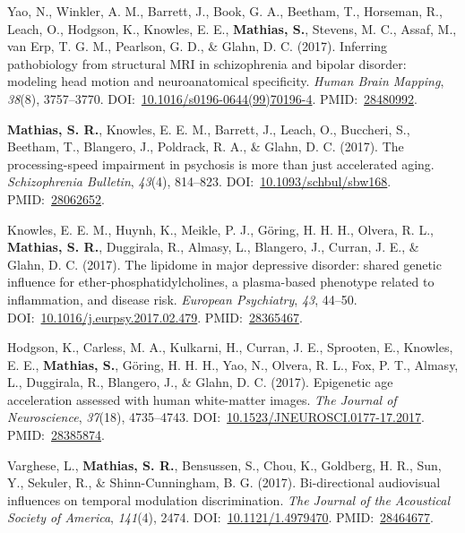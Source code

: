 \documentclass[10pt]{article}
\makeatletter
\newlength{\bibhang}
\newlength{\bibsep}
 {\@listi \global\bibsep\itemsep \global\advance\bibsep by\parsep}
\newenvironment{bibsection}%
        {\vspace{-\baselineskip}\begin{list}{}{%
       \setlength{\leftmargin}{\bibhang}%
       \setlength{\itemindent}{-\leftmargin}%
       \setlength{\itemsep}{\bibsep}%
       \setlength{\parsep}{\z@}%
        \setlength{\partopsep}{0pt}%
        \setlength{\topsep}{0pt}}}
        {\end{list}\vspace{-.6\baselineskip}}
\makeatother
\begin{document}
\begin{bibsection}
\item Yao, N., Winkler, A. M., Barrett, J., Book, G. A., Beetham, T., Horseman, R., Leach, O., Hodgson, K., Knowles, E. E., \textbf{Mathias, S.}, Stevens, M. C., Assaf, M., van Erp, T. G. M., Pearlson, G. D., \& Glahn, D. C. (2017). Inferring pathobiology from structural MRI in schizophrenia and bipolar disorder: modeling head motion and neuroanatomical specificity. \emph{Human Brain Mapping}, \emph{38}(8), 3757--3770. DOI:~\href{https://doi.org/10.1016/s0196-0644(99)70196-4}{10.1016/s0196-0644(99)70196-4}. PMID:~\href{https://www.ncbi.nlm.nih.gov/pubmed/?term=28480992}{28480992}.
\item \textbf{Mathias, S. R.}, Knowles, E. E. M., Barrett, J., Leach, O., Buccheri, S., Beetham, T., Blangero, J., Poldrack, R. A., \& Glahn, D. C. (2017). The processing-speed impairment in psychosis is more than just accelerated aging. \emph{Schizophrenia Bulletin}, \emph{43}(4), 814--823. DOI:~\href{https://doi.org/10.1093/schbul/sbw168}{10.1093/schbul/sbw168}. PMID:~\href{https://www.ncbi.nlm.nih.gov/pubmed/?term=28062652}{28062652}.
\item Knowles, E. E. M., Huynh, K., Meikle, P. J., Göring, H. H. H., Olvera, R. L., \textbf{Mathias, S. R.}, Duggirala, R., Almasy, L., Blangero, J., Curran, J. E., \& Glahn, D. C. (2017). The lipidome in major depressive disorder: shared genetic influence for ether-phosphatidylcholines, a plasma-based phenotype related to inflammation, and disease risk. \emph{European Psychiatry}, \emph{43}, 44--50. DOI:~\href{https://doi.org/10.1016/j.eurpsy.2017.02.479}{10.1016/j.eurpsy.2017.02.479}. PMID:~\href{https://www.ncbi.nlm.nih.gov/pubmed/?term=28365467}{28365467}.
\item Hodgson, K., Carless, M. A., Kulkarni, H., Curran, J. E., Sprooten, E., Knowles, E. E., \textbf{Mathias, S.}, Göring, H. H. H., Yao, N., Olvera, R. L., Fox, P. T., Almasy, L., Duggirala, R., Blangero, J., \& Glahn, D. C. (2017). Epigenetic age acceleration assessed with human white-matter images. \emph{The Journal of Neuroscience}, \emph{37}(18), 4735--4743. DOI:~\href{https://doi.org/10.1523/JNEUROSCI.0177-17.2017}{10.1523/JNEUROSCI.0177-17.2017}. PMID:~\href{https://www.ncbi.nlm.nih.gov/pubmed/?term=28385874}{28385874}.
\item Varghese, L., \textbf{Mathias, S. R.}, Bensussen, S., Chou, K., Goldberg, H. R., Sun, Y., Sekuler, R., \& Shinn-Cunningham, B. G. (2017). Bi-directional audiovisual influences on temporal modulation discrimination. \emph{The Journal of the Acoustical Society of America}, \emph{141}(4), 2474. DOI:~\href{https://doi.org/10.1121/1.4979470}{10.1121/1.4979470}. PMID:~\href{https://www.ncbi.nlm.nih.gov/pubmed/?term=28464677}{28464677}.

\end{bibsection}
\end{document}
